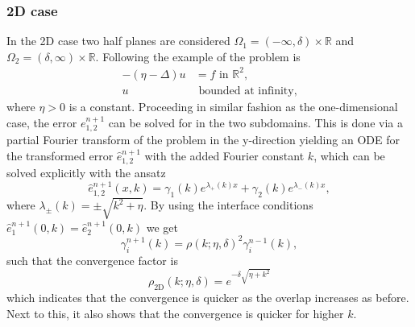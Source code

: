 \subsubsection{2D case}
In the 2D case two half planes are considered $\Omega_1 = (-\infty, \delta)\times \mathbb{R}$ and $\Omega_2 = (\delta, \infty)\times \mathbb{R}$. Following the example of \cite[Section 1.5.2]{schwarz_methods_Dolean_2015} the problem is
\begin{align*}
  -(\eta - \Delta) u & = f \text{ in } \mathbb{R}^2, \\
  u                  & \text{ bounded at infinity},
\end{align*}
where $\eta > 0$ is a constant. Proceeding in similar fashion as the one-dimensional case, the error $e^{n+1}_{1,2}$ can be solved for in the two subdomains. This is done via a partial Fourier transform of the problem in the y-direction yielding an ODE for the transformed error $\hat{e}^{n+1}_{1,2}$ with the added Fourier constant $k$, which can be solved explicitly with the ansatz
\[
  \hat{e}^{n+1}_{1,2}(x, k) = \gamma_1(k) e^{\lambda_{+}(k) x} + \gamma_2(k) e^{\lambda_{-}(k) x},
\]
where $\lambda_{\pm}(k) = \pm \sqrt{k^2 + \eta}$. By using the interface conditions $\hat{e}^{n+1}_{1}(0, k) = \hat{e}^{n+1}_{2}(0, k)$ we get
\[
  \gamma_{i}^{n+1}(k) = \rho(k;\eta,\delta)^2 \gamma_{i}^{n-1}(k),
\]
such that the convergence factor is \cite[Equation 1.36]{schwarz_methods_Dolean_2015}
\begin{equation}
  \rho_{\text{2D}}(k;\eta,\delta) = e^{-\delta\sqrt{\eta + k^2}}
  \label{eq:2D_Schwarz_convergence}
\end{equation}
which indicates that the convergence is quicker as the overlap increases as before. Next to this, it also shows that the convergence is quicker for higher $k$.

